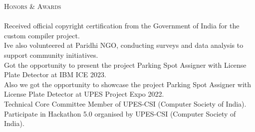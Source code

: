 \documentclass[a4paper]{article}
\newcommand{\lineunder} {
    \vspace*{-8pt} \\
    \hspace*{-18pt} \hrulefill \\
}
\newcommand{\header} [1] {
    {\hspace*{-18pt}\vspace*{6pt} \textsc{#1}}
    \vspace*{-6pt} \lineunder
}
\begin{document}
\header{Honors \& Awards}
      \vspace{2mm} 
      Received official copyright certification from the Government of India for the custom compiler project.\\
\vspace*{1mm}
      I\textquotesingle{}ve also volunteered at Paridhi NGO, conducting surveys and data analysis to support community initiatives.\\
\vspace*{1mm}
      Got the opportunity to present the project Parking Spot Assigner with License Plate Detector at IBM ICE 2023.\\
\vspace*{1mm}
      Also we got the opportunity to showcase the project Parking Spot Assigner with License Plate Detector at UPES Project Expo 2022.\\
\vspace*{1mm}
      Technical Core Committee Member of UPES-CSI (Computer Society of India).\\
\vspace*{1mm}
      Participate in Hackathon 5.0 organised by UPES-CSI (Computer Society of India).\\
\vspace*{1mm}

    \ 
    
\end{document}
